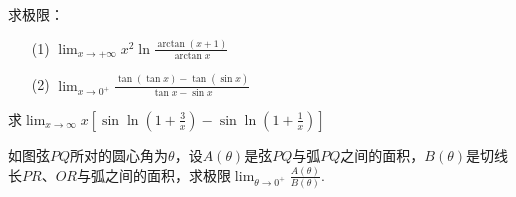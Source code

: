 \begin{xiti}
\item 求极限：
\begin{enumerate}
	\item[(1)] $\lim _ { x \rightarrow + \infty } x ^ { 2 } \ln \frac { \arctan ( x + 1 ) } { \arctan x }$
	\item[(2)] $\lim _ { x \rightarrow 0 ^ {+ } } \frac { \tan ( \tan x ) - \tan ( \sin x ) } { \tan x - \sin x }$
\end{enumerate}
\item 求$\lim _ { x \rightarrow \infty } x \left[ \sin \ln \left( 1 + \frac { 3 } { x } \right) - \sin \ln \left( 1 + \frac { 1 } { x } \right) \right]$
\item 如图弦$PQ$所对的圆心角为$\theta$，设$A(\theta)$是弦$PQ$与弧$PQ$之间的面积，$B(\theta)$是切线长$PR$、$OR$与弧之间的面积，求极限$\lim _ { \theta \rightarrow 0 ^ { + } } \frac { A ( \theta ) } { B ( \theta ) }$.


\end{xiti}
